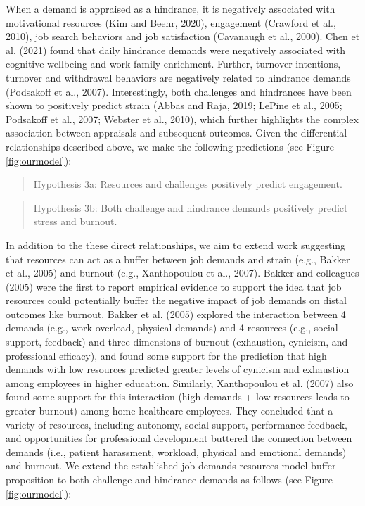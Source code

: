 \documentclass[
  man]{apa7}
\begin{document}
When a demand is appraised as a hindrance, it is negatively associated with motivational resources (Kim and Beehr, 2020), engagement (Crawford et al., 2010), job search behaviors and job satisfaction (Cavanaugh et al., 2000). Chen et al. (2021) found that daily hindrance demands were negatively associated with cognitive wellbeing and work family enrichment. Further, turnover intentions, turnover and withdrawal behaviors are negatively related to hindrance demands (Podsakoff et al., 2007). Interestingly, both challenges and hindrances have been shown to positively predict strain (Abbas and Raja, 2019; LePine et al., 2005; Podsakoff et al., 2007; Webster et al., 2010), which further highlights the complex association between appraisals and subsequent outcomes. Given the differential relationships described above, we make the following predictions (see Figure \ref{fig:ourmodel}):

\begin{quote}
Hypothesis 3a: Resources and challenges positively predict engagement.
\end{quote}

\begin{quote}
Hypothesis 3b: Both challenge and hindrance demands positively predict stress and burnout.
\end{quote}

In addition to the these direct relationships, we aim to extend work suggesting that resources can act as a buffer between job demands and strain (e.g., Bakker et al., 2005) and burnout (e.g., Xanthopoulou et al., 2007). Bakker and colleagues (2005) were the first to report empirical evidence to support the idea that job resources could potentially buffer the negative impact of job demands on distal outcomes like burnout. Bakker et al. (2005) explored the interaction between 4 demands (e.g., work overload, physical demands) and 4 resources (e.g., social support, feedback) and three dimensions of burnout (exhaustion, cynicism, and professional efficacy), and found some support for the prediction that high demands with low resources predicted greater levels of cynicism and exhaustion among employees in higher education. Similarly, Xanthopoulou et al. (2007) also found some support for this interaction (high demands + low resources leads to greater burnout) among home healthcare employees. They concluded that a variety of resources, including autonomy, social support, performance feedback, and opportunities for professional development buttered the connection between demands (i.e., patient harassment, workload, physical and emotional demands) and burnout. We extend the established job demands-resources model buffer proposition to both challenge and hindrance demands as follows (see Figure \ref{fig:ourmodel}):
\end{document}
